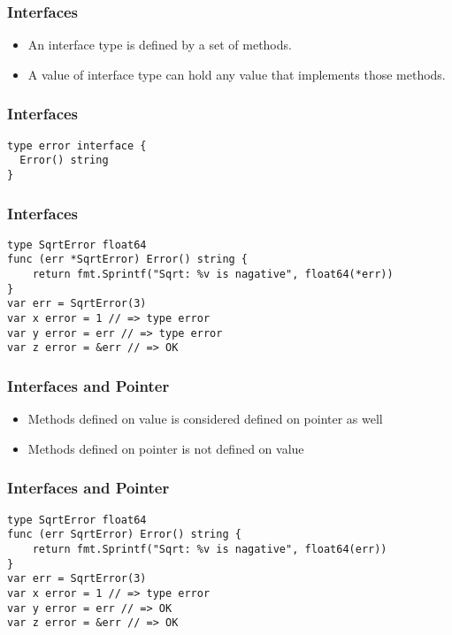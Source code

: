 \documentclass[xetex,mathserif,serif,12pt]{beamer}
\begin{document}
\begin{frame}
  \frametitle{Interfaces}

  \begin{itemize}
  \item An interface type is defined by a set of methods.
  \item A value of interface type can hold any value that implements those methods.
  \end{itemize}
\end{frame}

\begin{frame}[fragile]
  \frametitle{Interfaces}

  \begin{beamer@nomargin}
    \begin{lstlisting}
type error interface {
  Error() string
}
    \end{lstlisting}
  \end{beamer@nomargin}
\end{frame}

\begin{frame}[fragile]
  \frametitle{Interfaces}

  \begin{beamer@nomargin}
    \begin{lstlisting}
type SqrtError float64
func (err *SqrtError) Error() string {
	return fmt.Sprintf("Sqrt: %v is nagative", float64(*err))
}
var err = SqrtError(3)
var x error = 1 // => type error
var y error = err // => type error
var z error = &err // => OK
    \end{lstlisting}
  \end{beamer@nomargin}
\end{frame}

\begin{frame}
  \frametitle{Interfaces and Pointer}

  \begin{itemize}
  \item Methods defined on value is considered defined on pointer as well
  \item Methods defined on pointer is not defined on value
  \end{itemize}
\end{frame}

\begin{frame}[fragile]
  \frametitle{Interfaces and Pointer}

  \begin{beamer@nomargin}
    \begin{lstlisting}
type SqrtError float64
func (err SqrtError) Error() string {
	return fmt.Sprintf("Sqrt: %v is nagative", float64(err))
}
var err = SqrtError(3)
var x error = 1 // => type error
var y error = err // => OK
var z error = &err // => OK
    \end{lstlisting}
  \end{beamer@nomargin}
\end{frame}
\end{document}
